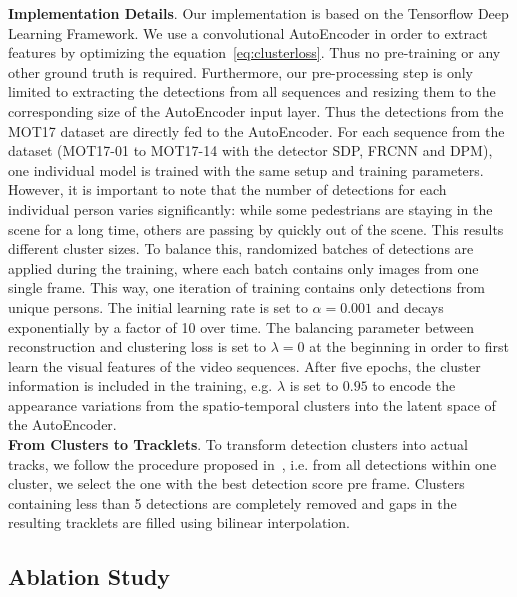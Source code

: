 \noindent\textbf{Implementation Details}.
\label{subsec:experiment}
Our implementation is based on the Tensorflow Deep Learning Framework. 
We use a convolutional AutoEncoder in order to extract features by optimizing the equation~\eqref{eq:clusterloss}.
Thus no pre-training or any other ground truth is required. 
Furthermore, our pre-processing step is only limited to extracting the detections from all sequences and resizing them to the corresponding size of the AutoEncoder input layer. 
Thus the detections from the MOT17 dataset are directly fed to the AutoEncoder. 
For each sequence from the dataset (MOT17-01 to MOT17-14 with the detector SDP, FRCNN and DPM), one individual model is trained with the same setup and training parameters.
However, it is important to note that the number of detections for each individual person varies significantly:
while some pedestrians are staying in the scene for a long time, others are passing by quickly out of the scene. 
This results different cluster sizes.
To balance this, randomized batches of detections are applied during the training, where each batch contains only images from one single frame. 
This way, one iteration of training contains only detections from unique persons. The initial learning rate is set to $\alpha=0.001$ and decays exponentially by a factor of 10 over time. 
The balancing parameter between reconstruction and clustering loss is set to $\lambda = 0$ at the beginning in order to first learn the visual features of the video sequences. 
After five epochs, the cluster information is included in the training, e.g. $\lambda$ is set to $0.95$ to encode the appearance variations from the spatio-temporal clusters into the latent space of the AutoEncoder.\\

\noindent\textbf{From Clusters to Tracklets}. 
To transform detection clusters into actual tracks, we follow the procedure proposed in~\cite{tang2016multi}, i.e. from all detections within one cluster, we select the one with the best detection score pre frame. Clusters containing less than 5 detections are completely removed and gaps in the resulting tracklets are filled using bilinear interpolation. 

\subsection{Ablation Study}
\label{subsec:ablationstudy}

